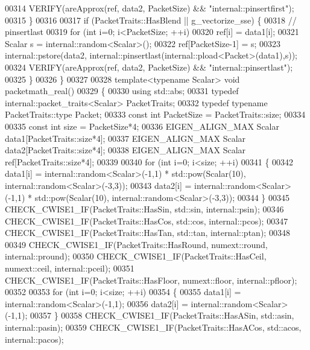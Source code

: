 \begin{DoxyCode}
00314     VERIFY(areApprox(ref, data2, PacketSize) && \textcolor{stringliteral}{"internal::pinsertfirst"});
00315   \}
00316 
00317   \textcolor{keywordflow}{if} (PacketTraits::HasBlend || g\_vectorize\_sse) \{
00318     \textcolor{comment}{// pinsertlast}
00319     \textcolor{keywordflow}{for} (\textcolor{keywordtype}{int} i=0; i<PacketSize; ++i)
00320       ref[i] = data1[i];
00321     Scalar s = internal::random<Scalar>();
00322     ref[PacketSize-1] = s;
00323     internal::pstore(data2, internal::pinsertlast(internal::pload<Packet>(data1),s));
00324     VERIFY(areApprox(ref, data2, PacketSize) && \textcolor{stringliteral}{"internal::pinsertlast"});
00325   \}
00326 \}
00327 
00328 \textcolor{keyword}{template}<\textcolor{keyword}{typename} Scalar> \textcolor{keywordtype}{void} packetmath\_real()
00329 \{
00330   \textcolor{keyword}{using} std::abs;
00331   \textcolor{keyword}{typedef} internal::packet\_traits<Scalar> PacketTraits;
00332   \textcolor{keyword}{typedef} \textcolor{keyword}{typename} PacketTraits::type Packet;
00333   \textcolor{keyword}{const} \textcolor{keywordtype}{int} PacketSize = PacketTraits::size;
00334 
00335   \textcolor{keyword}{const} \textcolor{keywordtype}{int} size = PacketSize*4;
00336   EIGEN\_ALIGN\_MAX Scalar data1[PacketTraits::size*4];
00337   EIGEN\_ALIGN\_MAX Scalar data2[PacketTraits::size*4];
00338   EIGEN\_ALIGN\_MAX Scalar ref[PacketTraits::size*4];
00339 
00340   \textcolor{keywordflow}{for} (\textcolor{keywordtype}{int} i=0; i<size; ++i)
00341   \{
00342     data1[i] = internal::random<Scalar>(-1,1) * std::pow(Scalar(10), internal::random<Scalar>(-3,3));
00343     data2[i] = internal::random<Scalar>(-1,1) * std::pow(Scalar(10), internal::random<Scalar>(-3,3));
00344   \}
00345   CHECK\_CWISE1\_IF(PacketTraits::HasSin, std::sin, internal::psin);
00346   CHECK\_CWISE1\_IF(PacketTraits::HasCos, std::cos, internal::pcos);
00347   CHECK\_CWISE1\_IF(PacketTraits::HasTan, std::tan, internal::ptan);
00348 
00349   CHECK\_CWISE1\_IF(PacketTraits::HasRound, numext::round, internal::pround);
00350   CHECK\_CWISE1\_IF(PacketTraits::HasCeil, numext::ceil, internal::pceil);
00351   CHECK\_CWISE1\_IF(PacketTraits::HasFloor, numext::floor, internal::pfloor);
00352 
00353   \textcolor{keywordflow}{for} (\textcolor{keywordtype}{int} i=0; i<size; ++i)
00354   \{
00355     data1[i] = internal::random<Scalar>(-1,1);
00356     data2[i] = internal::random<Scalar>(-1,1);
00357   \}
00358   CHECK\_CWISE1\_IF(PacketTraits::HasASin, std::asin, internal::pasin);
00359   CHECK\_CWISE1\_IF(PacketTraits::HasACos, std::acos, internal::pacos);

\end{DoxyCode}
